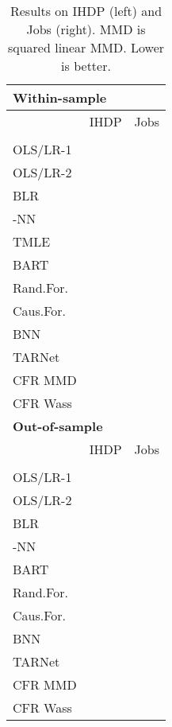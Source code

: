\documentclass{article}
\def\tarnet{{TARNet}}
\begin{document}
\begin{table}[t!]
  \caption{\label{tbl:ihdp_jobs_results}Results on IHDP (left) and Jobs (right). MMD is squared linear MMD. Lower is better. \vspace{-1.3em}}
  \begin{center}
    \begin{small}
      \begin{sc}
      \begin{tabular}{l|cc|cc}
        \multicolumn{5}{l}{\bf{Within-sample}} \\
        \hline
        & \multicolumn{2}{c|}{IHDP} & \multicolumn{2}{c}{Jobs} \\
        &  &  &   & \\
        \hline
        OLS/LR-1 &  &  &  &  \\
        OLS/LR-2  &  &  &  &  \\
        BLR  &  &  &  &  \\
        -NN &  &  &  &  \\
		    TMLE  &  &  &  &  \\
BART  &  &  &  &  \\
        Rand.For.  &  &  &  &  \\
        Caus.For.  &  &  &  &  \\
        BNN  &  &  &  &  \\
\tarnet{}  &  &  &  &  \\
        CFR MMD &  &  &  &  \\
        CFR Wass &  &  &  &  \\
        \hline
        \multicolumn{5}{l}{\bf{Out-of-sample}} \\
        \hline
        & \multicolumn{2}{c|}{IHDP} & \multicolumn{2}{c}{Jobs} \\
        &  &  &   & \\
        \hline
        OLS/LR-1  &  &  &  &  \\
        OLS/LR-2  &  &  &  &  \\
        BLR  &  &  &  &  \\
        -NN &  &  &  &  \\
BART  &  &  &  &  \\
        Rand.For.  &  &  &  &  \\
        Caus.For.  &  &  &  &  \\
BNN  &  &  &  &  \\
\tarnet{}  &  &  &  &  \\
        CFR MMD &  &  &  &  \\
        CFR Wass &  &  &  &   \\
        \hline
      \end{tabular}
    \end{sc}
    \end{small}
  \end{center}
  \vspace{-1em}
\end{table}
\end{document}
